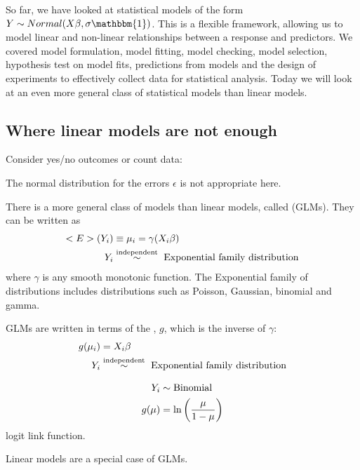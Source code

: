 So far, we have looked at statistical models of the form $Y\sim Normal(X\beta,\sigma\mathbbm{1})$. This is a flexible framework, allowing us to model linear and non-linear relationships between a response and predictors. We covered model formulation, model fitting, model checking, model selection, hypothesis test on model fits, predictions from models and the design of experiments to effectively collect data for statistical analysis. Today we will look at an even more general class of statistical models than linear models.

\subsection{Where linear models are not enough}

\begin{example}
	Consider yes/no outcomes or count data:
	
	The normal distribution for the errors $\epsilon$ is not appropriate here.
\end{example}

There is a more general class of models than linear models, called  (GLMs). They can be written as
\begin{align}
	\mathbb{E}(Y_i) &\equiv \mu_i =\gamma(X_i\beta) \notag \\
	Y_i &\overset{\text{independent}}{\sim} \text{ Exponential family distribution} \notag
\end{align}
where $\gamma$ is any smooth monotonic function. The Exponential family of distributions includes distributions such as Poisson, Gaussian, binomial and gamma.

GLMs are written in terms of the , $g$, which is the inverse of $\gamma$:
\begin{align}
	g(\mu_i) &= X_i\beta \notag \\
	Y_i &\overset{\text{independent}}{\sim} \text{ Exponential family distribution} \notag
\end{align}

\begin{example}
	\begin{align}
		Y_i &\sim \text{Binomial} \notag \\
		g(\mu) &= \ln\left(\frac{\mu}{1-\mu}\right)\notag
	\end{align}
	logit link function.
\end{example}

\begin{example}
	Linear models are a special case of GLMs.
\end{example}

